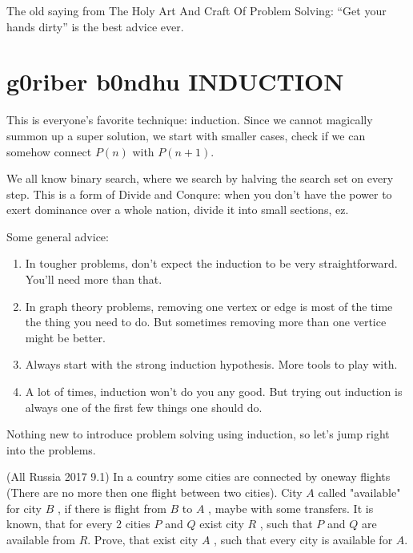 \documentclass[12pt,a4paper]{article}
\begin{document}
	The old saying from The Holy Art And Craft Of Problem Solving: ``Get your hands dirty'' is the best advice ever. 
	
	
	\section{g0riber b0ndhu INDUCTION}
	
		This is everyone's favorite technique: induction. Since we cannot magically summon up a super solution, we start with smaller cases, check if we can somehow connect $ P(n) $ with $ P(n+1) $.
		
		We all know binary search, where we search by halving the search set on every step. This is a form of Divide and Conqure: when you don't have the power to exert dominance over a whole nation, divide it into small sections, ez. 
		
		Some general advice:
			
			\begin{enumerate}
				\itemsep0em
				\item In tougher problems, don't expect the induction to be very straightforward. You'll need more than that.
				\item In graph theory problems, removing one vertex or edge is most of the time the thing you need to do. But sometimes removing more than one vertice might be better.
				\item Always start with the strong induction hypothesis. More tools to play with.
				\item A lot of times, induction won't do you any good. But trying out induction is always one of the first few things one should do.
			\end{enumerate}
		
		Nothing new to introduce problem solving using induction, so let's jump right into the problems.
		
		
		
		\begin{problem}(All Russia 2017 9.1)
			In a country some cities are connected by oneway flights (There are no more then one flight between two cities). City $ A $ called "available" for city $ B $ , if there is flight from $ B $ to $ A $ , maybe with some transfers. It is known, that for every 2 cities $ P $ and $ Q $ exist city $ R $ , such that $ P $ and $ Q $ are available from $ R $. Prove, that exist city $ A $ , such that every city is available for $ A $.
		\end{problem}
	
\end{document}
